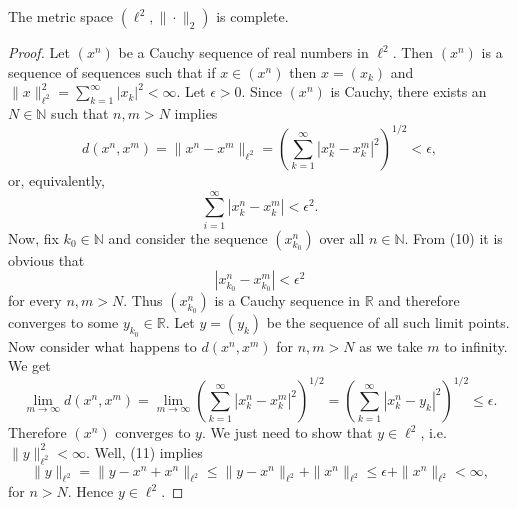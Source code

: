 \documentclass[11pt]{article}
\begin{document}
\begin{Proposition}
  The metric space $(\ell^{2}, \|\cdot\|_{2})$ is complete.
\end{Proposition}

\begin{proof}
  Let $(x^{n})$ be a Cauchy sequence of real numbers in $\ell^{2}$. Then
  $(x^{n})$ is a sequence of sequences such that if $x\in (x^{n})$ then $x =
  (x_{k})$ and $\|x\|_{\ell^{2}}^{2} = \sum_{k=1}^{\infty}|x_{k}|^{2} < \infty$. Let $\epsilon > 0$.
  Since $(x^{n})$ is Cauchy, there exists an $N \in \mathbb{N}$ such that $n,m >
  N$ implies 
  \[ d(x^{n}, x^{m}) = \|x^{n} - x^{m}\|_{\ell^{2}} = \left(\sum_{k=1}^{\infty}|x_{k}^{n}
  - x_{k}^{m}|^{2}\right)^{1/2} < \epsilon, \]
  or, equivalently,
  \begin{equation}
    \sum_{i=1}^{\infty}|x_{k}^{n} - x_{k}^{m}| < \epsilon^{2}. 
  \end{equation}
  Now, fix $k_{0} \in \mathbb{N}$ and consider the sequence $(x_{k_{0}}^{n})$ over
  all $n \in \mathbb{N}$. From (10) it is obvious that 
  \[ |x_{k_{0}}^{n} - x_{k_{0}}^{m}| < \epsilon^{2} \]
  for every $n, m > N$. Thus $(x_{k_{0}}^{n})$ is a Cauchy sequence in
  $\mathbb{R}$ and therefore converges to some $y_{k_{0}} \in \mathbb{R}$. Let
  $y = (y_{k})$ be the sequence of all such limit points. Now consider what
  happens to
  $d(x^{n}, x^{m})$ for $n,m > N$ as we take $m$ to infinity. We get
  \begin{equation}
    \lim_{m\rightarrow \infty} d(x^{n}, x^{m}) = \lim_{m\rightarrow \infty} 
    \left(\sum_{k=1}^{\infty}|x_{k}^{n} - x_{k}^{m}|^{2}\right)^{1/2} =
    \left(\sum_{k=1}^{\infty}|x_{k}^{n} - y_{k}|^{2}\right)^{1/2} \leq \epsilon.
  \end{equation}
  Therefore $(x^{n})$ converges to $y$. We just need to show that $y \in \ell^{2}$, i.e.
  $\|y\|_{\ell^{2}}^{2} < \infty$. Well, (11) implies 
  \[ \|y\|_{\ell^{2}} = \|y - x^{n} + x^{n}\|_{\ell^{2}} \leq \|y - x^{n}\|_{\ell^{2}} +
  \|x^{n}\|_{\ell^{2}} \leq \epsilon + \|x^{n}\|_{\ell^{2}} < \infty, \]
  for $n > N$. Hence $y \in \ell^{2}$.
\end{proof}
\end{document}
